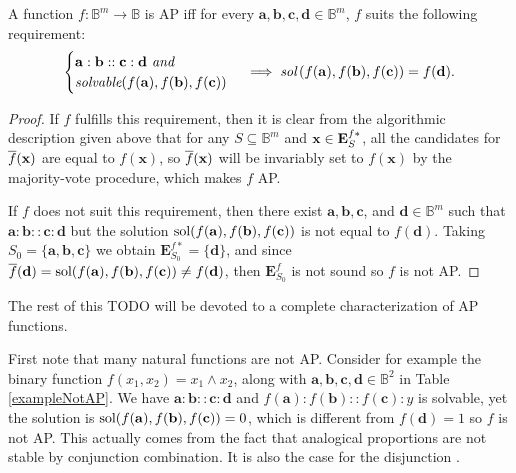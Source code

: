 \begin{proposition}
  \label{PROPOS:equivalent_def_AP}
  A function $f \colon \mathbb{B}^m \to \mathbb{B}$ is AP iff for every
  $\mathbf{a}, \mathbf{b}, \mathbf{c}, \mathbf{d} \in \mathbb{B}^m$, $f$ suits
  the following requirement:
  $$
  \begin{cases}
    \mathbf{a} :  \mathbf{b} ::  \mathbf{c} :  \mathbf{d} \emph{ and }\\
    \emph{solvable}(f(\mathbf{a}), f(\mathbf{b}),  f(\mathbf{c}))
  \end{cases}
  \implies \emph{sol}\left(f(\mathbf{a}),  f(\mathbf{b}),  f(\mathbf{c})\right) =
  f(\mathbf{d}). $$
\end{proposition}
\begin{proof}
  If $f$ fulfills  this requirement, then it is clear from the algorithmic
  description given above that for any $S \subseteq \mathbb{B}^m$ and
  $\mathbf{x} \in \mathbf{E}_{S}^{f*}$, all the candidates for $\overline{f}(\mathbf{x})$ are equal
  to $f(\mathbf{x})$, so $\overline{f}(\mathbf{x})$ will be invariably set to
  $f(\mathbf{x})$ by the majority-vote procedure, which makes $f$ AP.

If $f$ does not suit this requirement, then there exist $\mathbf{a},
  \mathbf{b}, \mathbf{c}$, and $\mathbf{d} \in \mathbb{B}^m$ such that
  $\mathbf{a} : \mathbf{b} :: \mathbf{c} : \mathbf{d}$ but the solution
  $\text{sol}(f(\mathbf{a}), f(\mathbf{b}), f(\mathbf{c}))$ is not equal to
  $f(\mathbf{d})$. Taking $S_0 = \{\mathbf{a}, \mathbf{b}, \mathbf{c}\}$ we
  obtain $\mathbf{E}^{f*}_{S_0} = \{\mathbf{d}\}$, and since $\overline{f}(\mathbf{d})
  = \text{sol}(f(\mathbf{a}), f(\mathbf{b}), f(\mathbf{c})) \neq f(\mathbf{d})$, then
  $\mathbf{E}_{S_0}^f$ is not sound so $f$ is not AP.
\end{proof}

\noindent
The rest of this TODO will be devoted to a complete characterization of AP
functions.

First note that many natural functions are not AP. Consider for example the
binary function $f(x_1,x_2)= x_1 \wedge x_2$, along with $\mathbf{a},
\mathbf{b}, \mathbf{c}, \mathbf{d} \in \mathbb{B}^2$ in Table
\ref{exampleNotAP}.  We have $\mathbf{a} : \mathbf{b} :: \mathbf{c} :
\mathbf{d}$ and $f(\mathbf{a}) : f(\mathbf{b}) :: f(\mathbf{c}) : y$ is
solvable, yet the solution is $\text{sol}(f(\mathbf{a}), f(\mathbf{b}),
f(\mathbf{c}))=0$, which  is different from $f(\mathbf{d})=1$ so $f$ is not AP.
This actually comes from the fact that analogical proportions are not stable by
conjunction combination. It is also the case for the disjunction
\cite{PraRic14}.

